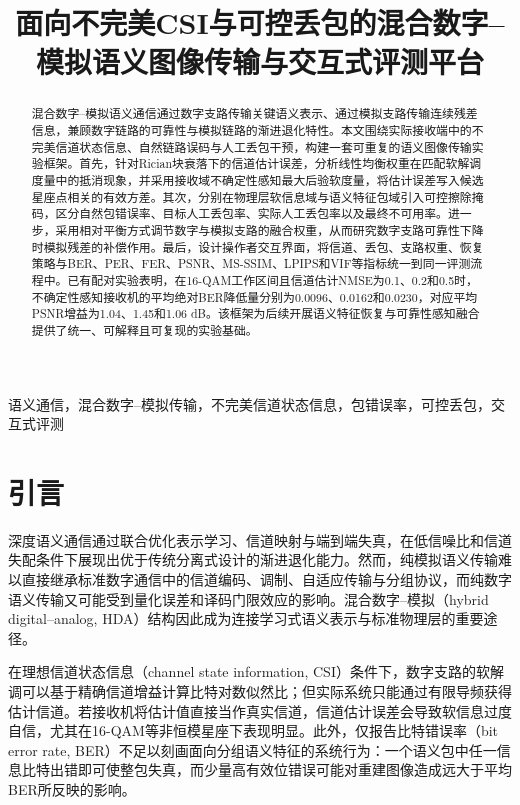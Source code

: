 \documentclass[conference]{IEEEtran}
\title{面向不完美CSI与可控丢包的混合数字--模拟语义图像传输与交互式评测平台}
\author{\IEEEauthorblockN{第一作者，第二作者}
\IEEEauthorblockA{学院或实验室名称\\
学校或机构名称\\
城市，国家\\
电子邮箱}}
\begin{document}
\maketitle

\begin{abstract}
混合数字--模拟语义通信通过数字支路传输关键语义表示、通过模拟支路传输连续残差信息，兼顾数字链路的可靠性与模拟链路的渐进退化特性。本文围绕实际接收端中的不完美信道状态信息、自然链路误码与人工丢包干预，构建一套可重复的语义图像传输实验框架。首先，针对Rician块衰落下的信道估计误差，分析线性均衡权重在匹配软解调度量中的抵消现象，并采用接收域不确定性感知最大后验软度量，将估计误差写入候选星座点相关的有效方差。其次，分别在物理层软信息域与语义特征包域引入可控擦除掩码，区分自然包错误率、目标人工丢包率、实际人工丢包率以及最终不可用率。进一步，采用相对平衡方式调节数字与模拟支路的融合权重，从而研究数字支路可靠性下降时模拟残差的补偿作用。最后，设计操作者交互界面，将信道、丢包、支路权重、恢复策略与BER、PER、FER、PSNR、MS-SSIM、LPIPS和VIF等指标统一到同一评测流程中。已有配对实验表明，在16-QAM工作区间且信道估计NMSE为0.1、0.2和0.5时，不确定性感知接收机的平均绝对BER降低量分别为0.0096、0.0162和0.0230，对应平均PSNR增益为1.04、1.45和1.06 dB。该框架为后续开展语义特征恢复与可靠性感知融合提供了统一、可解释且可复现的实验基础。
\end{abstract}

\begin{IEEEkeywords}
语义通信，混合数字--模拟传输，不完美信道状态信息，包错误率，可控丢包，交互式评测
\end{IEEEkeywords}

\section{引言}
深度语义通信通过联合优化表示学习、信道映射与端到端失真，在低信噪比和信道失配条件下展现出优于传统分离式设计的渐进退化能力。然而，纯模拟语义传输难以直接继承标准数字通信中的信道编码、调制、自适应传输与分组协议，而纯数字语义传输又可能受到量化误差和译码门限效应的影响。混合数字--模拟（hybrid digital--analog, HDA）结构因此成为连接学习式语义表示与标准物理层的重要途径。

在理想信道状态信息（channel state information, CSI）条件下，数字支路的软解调可以基于精确信道增益计算比特对数似然比；但实际系统只能通过有限导频获得估计信道。若接收机将估计值直接当作真实信道，信道估计误差会导致软信息过度自信，尤其在16-QAM等非恒模星座下表现明显。此外，仅报告比特错误率（bit error rate, BER）不足以刻画面向分组语义特征的系统行为：一个语义包中任一信息比特出错即可使整包失真，而少量高有效位错误可能对重建图像造成远大于平均BER所反映的影响。
\end{document}
